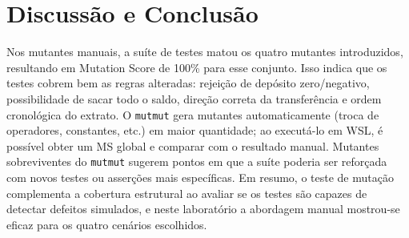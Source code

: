 \documentclass[11pt,a4paper]{article}
\begin{document}
\section{Discussão e Conclusão}

Nos mutantes manuais, a suíte de testes matou os quatro mutantes introduzidos, resultando em Mutation Score de 100\% para esse conjunto. Isso indica que os testes cobrem bem as regras alteradas: rejeição de depósito zero/negativo, possibilidade de sacar todo o saldo, direção correta da transferência e ordem cronológica do extrato. O \texttt{mutmut} gera mutantes automaticamente (troca de operadores, constantes, etc.) em maior quantidade; ao executá-lo em WSL, é possível obter um MS global e comparar com o resultado manual. Mutantes sobreviventes do \texttt{mutmut} sugerem pontos em que a suíte poderia ser reforçada com novos testes ou asserções mais específicas. Em resumo, o teste de mutação complementa a cobertura estrutural ao avaliar se os testes são capazes de detectar defeitos simulados, e neste laboratório a abordagem manual mostrou-se eficaz para os quatro cenários escolhidos.
\end{document}
